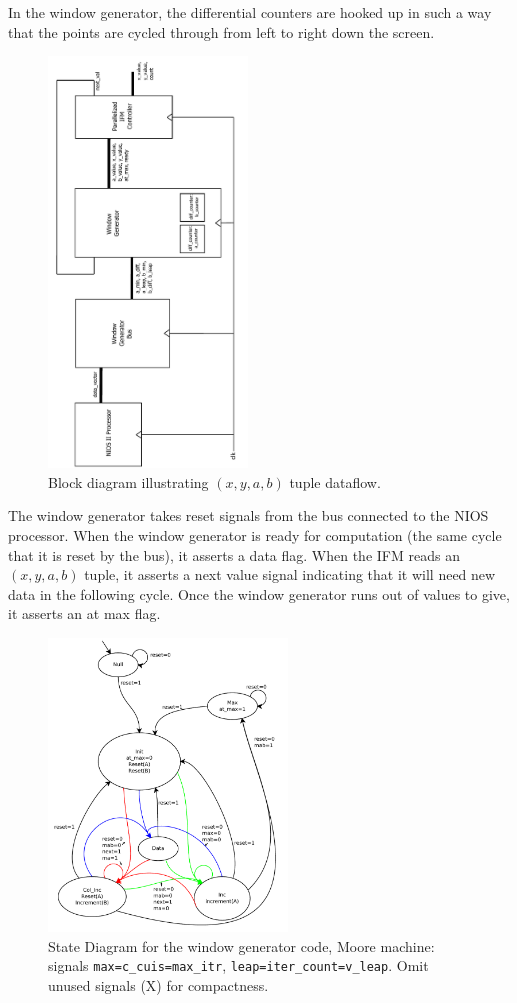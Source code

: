 \documentclass{article}
\begin{document}
In the window generator, the differential counters are hooked up in
such a way that the points are cycled through from left to right down
the screen.

\begin{figure}[H]
  \centering
    \includegraphics[width=150pt, angle=270]{block_diagrams/win_gen_interior.pdf}
  \caption{Block diagram illustrating $(x, y, a, b)$ tuple dataflow.}
\end{figure}

The window generator takes reset signals from the bus connected to the
NIOS processor. When the window generator is ready for computation
(the same cycle that it is reset by the bus), it asserts a data flag.
When the IFM reads an $(x, y, a, b)$ tuple, it asserts a next value
signal indicating that it will need new data in the following
cycle. Once the window generator runs out of values to give, it
asserts an at max flag.

\begin{figure}[H]
  \centering
    \includegraphics[width=180pt]{state_diagrams/diff_window_gen.pdf}
  \caption{State Diagram for the window generator code, Moore machine:
    signals \texttt{max=c\_cuis=max\_itr},
    \texttt{leap=iter\_count=v\_leap}. Omit unused signals (X) for
    compactness.}
\end{figure}
\end{document}
